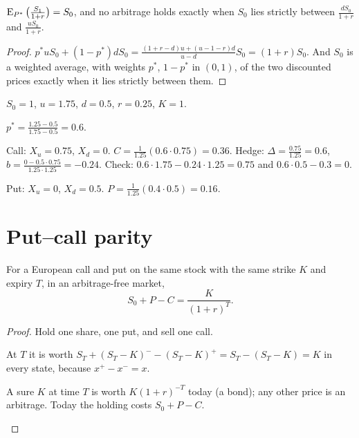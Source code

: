 \begin{result}
\label{res:disc-mg}
$\operatorname{E}_{P^*}\big(\frac{S_1}{1+r}\big)=S_0$, and no arbitrage holds exactly when $S_0$ lies strictly between $\frac{dS_0}{1+r}$ and $\frac{uS_0}{1+r}$.
\end{result}
\begin{proof}
$p^*uS_0+(1-p^*)dS_0=\frac{(1+r-d)u+(u-1-r)d}{u-d}S_0=(1+r)S_0$. And $S_0$ is a weighted average, with weights $p^*$, $1-p^*$ in $(0,1)$, of the two discounted prices exactly when it lies strictly between them.
\end{proof}

\begin{example}
\label{ex:call-put}
$S_0=1$, $u=1.75$, $d=0.5$, $r=0.25$, $K=1$.
\begin{steps}
  \item $p^*=\frac{1.25-0.5}{1.75-0.5}=0.6$.
  \item Call: $X_u=0.75$, $X_d=0$. $C=\frac{1}{1.25}(0.6\cdot0.75)=0.36$. Hedge: $\Delta=\frac{0.75}{1.25}=0.6$, $b=\frac{0-0.5\cdot0.75}{1.25\cdot1.25}=-0.24$. Check: $0.6\cdot1.75-0.24\cdot1.25=0.75$ and $0.6\cdot0.5-0.3=0$.
  \item Put: $X_u=0$, $X_d=0.5$. $P=\frac{1}{1.25}(0.4\cdot0.5)=0.16$.
\end{steps}
\end{example}

\section{Put--call parity}

\begin{theorem}
\label{thm:parity}
For a European call and put on the same stock with the same strike $K$ and expiry $T$, in an arbitrage-free market,
\[
  S_0+P-C=\frac{K}{(1+r)^T}.
\]
\end{theorem}
\begin{proof}
Hold one share, one put, and sell one call.
\begin{steps}
  \item At $T$ it is worth $S_T+(S_T-K)^--(S_T-K)^+=S_T-(S_T-K)=K$ in every state, because $x^+-x^-=x$.
  \item A sure $K$ at time $T$ is worth $K(1+r)^{-T}$ today (a bond); any other price is an arbitrage. Today the holding costs $S_0+P-C$. \qedhere
\end{steps}
\end{proof}

